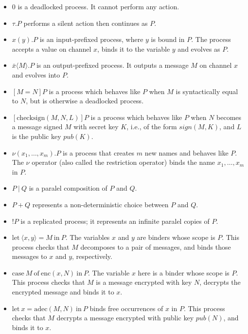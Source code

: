 \documentclass{article}
\begin{document}
\begin{itemize}
\item $0$ is a deadlocked process. It cannot perform any action.
\item $\tau.P$ performs a silent action then continues as $P$.
\item $x(y).P$ is an input-prefixed process, where $y$ is bound in $P$.
The process accepts a value on channel $x$, binds it to the
variable $y$ and evolves as $P$.
\item $\bar x\langle M \rangle.P$ is an output-prefixed process. It outputs a message $M$ on channel $x$
and evolves into $P$.
\item $[M = N] P$ is a process which behaves like $P$ when $M$ is syntactically equal to $N$,
but is otherwise a deadlocked process.
\item $[\mathrm{checksign}(M, N, L)] P$ is a process which behaves like $P$ when $N$ becomes a message signed $M$
with secret key $K$, i.e., of the form $sign(M, K)$, and $L$ is the public key $pub(K)$.
\item $\nu (x_1,\ldots,x_m). P$ is a process that creates $m$ new names and behaves like $P$. 
The $\nu$ operator (also called the restriction operator) binds the name $x_1,\ldots, x_m$ in $P$. 
\item $P ~|~ Q$ is a paralel composition of $P$ and $Q$.
\item $P + Q$ represents a non-deterministic choice between $P$ and $Q$.
\item $!P$ is a replicated process; it represents an infinite paralel copies of $P$. 
\item $\mathrm{let}~ \langle x, y \rangle = M ~ \mathrm{ in } ~ P.$ The variables $x$ and $y$
are binders whose scope is $P$. This process checks that $M$ decomposes to a pair of messages,
and binds those messages to $x$ and $y$, respectively. 
\item $\mathrm{case} ~ M ~ \mathrm{ of } ~ \mathrm{enc}(x,N) ~ \mathrm{ in } ~ P.$
The variable $x$ here is a binder whose scope is $P$. 
This process checks that $M$ is a message encrypted with key $N$, decrypts the
encrypted message and binds it to $x.$
\item $\mathrm{let} ~ x = \mathrm{adec}(M,N) ~ \mathrm{ in } ~ P$ 
binds free occurrences of $x$ in $P$. 
This process checks that $M$ decrypts a message encrypted with public key $pub(N)$, and binds it to $x$.
\end{itemize}
\end{document}
